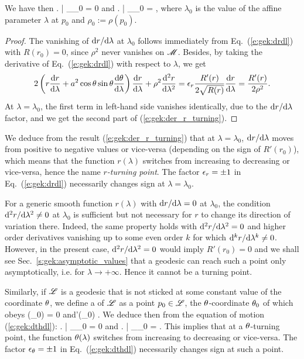 We have then
\be \label{e:gek:der_r_turning}
   \left.  \right| _{\lambda_0} = 0
   \quad\mbox{and}\quad
   \left.  \right| _{\lambda_0} =   ,
\ee
where $\lambda_0$ is the value of the affine parameter $\lambda$ at $p_0$
and $\rho_0 := \rho(p_0)$.
\begin{proof}
The vanishing of $\mathrm{d} r/\mathrm{d}\lambda$ at $\lambda_0$ follows immediately
from Eq.~(\ref{e:gek:drdl}) with $R(r_0)=0$, since $\rho^2$ never vanishes
on $\mathscr{M}$. Besides, by
taking the derivative of Eq.~(\ref{e:gek:drdl}) with respect to $\lambda$, we
get
\[
    2 \left(r \frac{\mathrm{d} r}{\mathrm{d} \lambda} + a^2 \cos\theta\sin\theta \frac{\mathrm{d} \theta}{\mathrm{d} \lambda} \right)
    \frac{\mathrm{d} r}{\mathrm{d} \lambda} + \rho^2 \frac{\mathrm{d}^2 r}{\mathrm{d}\lambda^2} =
    \epsilon_r \frac{R'(r)}{2\sqrt{R(r)}} \frac{\mathrm{d} r}{\mathrm{d} \lambda} = \frac{R'(r)}{2\rho^2} .
\]
At $\lambda=\lambda_0$, the first term in left-hand side vanishes identically,
due to the $\mathrm{d} r/\mathrm{d}\lambda$ factor,
and we get the second part of (\ref{e:gek:der_r_turning}).
\end{proof}

We deduce from the result (\ref{e:gek:der_r_turning}) that at $\lambda=\lambda_0$,
$\mathrm{d} r/\mathrm{d}\lambda$ moves from positive to negative values or vice-versa
(depending on the sign of $R'(r_0)$), which means that the function $r(\lambda)$
switches from increasing to decreasing or vice-versa, hence the name
\emph{$r$-turning point}. The factor $\epsilon_r=\pm 1$ in Eq.~(\ref{e:gek:drdl}) necessarily
changes sign at $\lambda=\lambda_0$.

\begin{remark} \label{r:gek:der_r_analytic}
For a generic smooth function $r(\lambda)$ with $\mathrm{d} r/\mathrm{d} \lambda=0$ at
$\lambda_0$, the condition $\mathrm{d}^2 r/\mathrm{d}\lambda^2\neq 0$ at $\lambda_0$
is sufficient but not necessary for $r$ to change its direction of variation there.
Indeed, the same property holds with $\mathrm{d}^2 r/\mathrm{d}\lambda^2= 0$ and higher order derivatives vanishing up to some even order $k$ for which
$\mathrm{d}^k r/\mathrm{d}\lambda^k\neq 0$. However, in the present case,
$\mathrm{d}^2 r/\mathrm{d}\lambda^2=0$ would imply $R'(r_0)=0$ and we shall see
Sec.~\ref{s:gek:asymptotic_values} that a geodesic can reach such a point only asymptotically,
i.e. for $\lambda\to +\infty$. Hence it cannot be a turning point.
\end{remark}


Similarly, if $\mathscr{L}$ is a geodesic that is not sticked at some constant value of the
coordinate $\theta$, we define a  of $\mathscr{L}$ as a point $p_0\in\mathscr{L}$, the
$\theta$-coordinate $\theta_0$ of which obeys
\be \label{e:gek:def_th_turning}
    \Theta(\th_0) = 0 \quad\mbox{and}\quad \Theta'(\theta_0)  .
\ee
We deduce then from the equation of motion (\ref{e:gek:dthdl}):
\be \label{e:gek:der_th_turning}
   \left. \derd{\th}{\lambda} \right| _{\lambda_0} = 0
   \quad\mbox{and}\quad
   \left.  \right| _{\lambda_0} =   .
\ee
This implies that at a $\theta$-turning point, the function $\theta(\lambda)$
switches from increasing to decreasing or vice-versa. The factor $\epsilon_\theta=\pm 1$ in Eq.~(\ref{e:gek:dthdl}) necessarily
changes sign at such a point.

